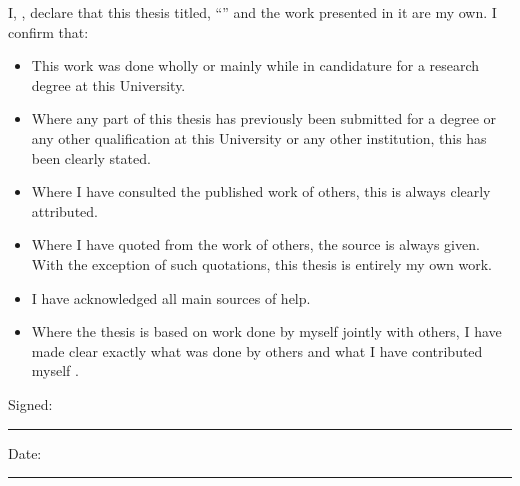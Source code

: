 \documentclass[
11pt, %
english, %
singlespacing, %
liststotoc, %
toctotoc, %
headsepline, %
chapterinoneline, %
]{MastersDoctoralThesis} %
\begin{document}

\begin{declaration}
  \addchaptertocentry{\authorshipname} %
  \noindent I, \authorname, declare that this thesis titled, \enquote{\ttitle} and the work presented in it are my own. I confirm that:

  \begin{itemize} 
  \item This work was done wholly or mainly while in candidature for a research degree at this University. 
  \item Where any part of this thesis has previously been submitted for a degree or any other qualification at this University or any other institution, this has been clearly stated.
  \item Where I have consulted the published work of others, this is always clearly attributed.
  \item Where I have quoted from the work of others, the source is always given. With the exception of such quotations, this thesis is entirely my own work.
  \item I have acknowledged all main sources of help.
  \item Where the thesis is based on work done by myself jointly with others, I have made clear exactly what was done by others and what I have contributed myself .

  \end{itemize}


  
  \noindent Signed:\\
  \rule[0.5em]{25em}{0.5pt} %
  
  \noindent Date:\\
  \rule[0.5em]{25em}{0.5pt} %
\end{declaration}


% 
% 

\end{document}
